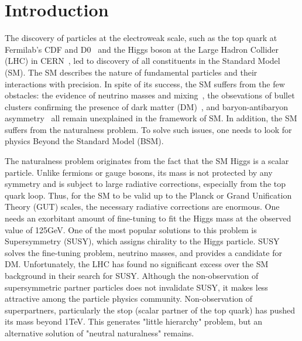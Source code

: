 \chapter{Introduction}\label{sec:introduction}

The discovery of particles at the electroweak scale, such as the top quark at Fermilab's CDF and D0~\cite{topD0,topCDF} and the Higgs boson at the Large Hadron Collider (LHC) in CERN~\cite{higgscms,higgsatlas}, led to discovery of all constituents in the Standard Model (SM). 
The SM describes the nature of fundamental particles and their interactions with precision. 
In spite of its success, the SM suffers from the few obstacles:
the evidence of neutrino masses and mixing~\cite{neutrino}, the obsevations of bullet clusters confirming the presence of dark matter (DM)~\cite{Baumgart:2009tn,Kaplan:2009ag,Chan:2011aa,Dienes:2011ja,Dienes:2012yz}, and baryon-antibaryon asymmetry~\cite{Cui:2014twa} all remain unexplained in the framework of SM. 
In addition, the SM suffers from the naturalness problem. 
To solve such issues, one needs to look for physics Beyond the Standard Model (BSM).

The naturalness problem originates from the fact that the SM Higgs is a scalar particle. 
Unlike fermions or gauge bosons, its mass is not protected by any symmetry and is subject to large radiative corrections, especially from the top quark loop. 
Thus, for the SM to be valid up to the Planck or Grand Unification Theory (GUT) scales, the necessary radiative corrections are enormous. 
One needs an exorbitant amount of fine-tuning to fit the Higgs mass at the observed value of 125GeV.
One of the most popular solutions to this problem is Supersymmetry (SUSY), which assigns chirality to the Higgs particle. 
SUSY solves the fine-tuning problem, neutrino masses, and provides a candidate for DM. 
Unfortunately, the LHC has found no significant excess over the SM background in their search for SUSY\cite{SUSY}. 
Although the non-observation of supersymmetric partner particles does not invalidate SUSY, it makes less attractive among the particle physics community. 
Non-observation of superpartners, particularly the stop (scalar partner of the top quark) has pushed its mass beyond 1TeV. 
This generates "little hierarchy" problem, but an alternative solution of "neutral naturalness" remains. 

